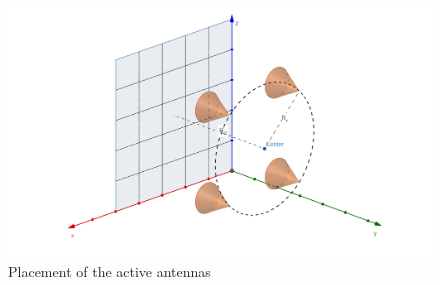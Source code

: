 \documentclass[12pt,draftclsnofoot,onecolumn,journal]{IEEEtran}
\begin{document}
\begin{figure}[htbp]
\includegraphics[width=5in]{posantenna.png} 
\caption{Placement of the active antennas} \label{fig:activeantepos}
\end{figure}
%
%
%
%
\end{document}
